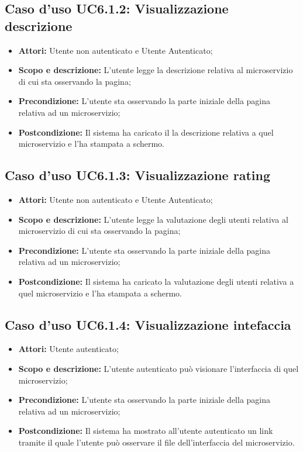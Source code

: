 \documentclass[12pt,a4paper,titlepage]{article}
\begin{document}
 \subsection{Caso d'uso UC6.1.2: Visualizzazione descrizione}
 \begin{itemize}
 	\item \textbf{Attori: }Utente non autenticato e Utente Autenticato;
 	\item \textbf{Scopo e descrizione: }L'utente legge la descrizione relativa al microservizio di cui sta osservando la pagina;
 	\item \textbf{Precondizione: }L'utente sta osservando la parte iniziale della pagina relativa ad un microservizio;
 	\item \textbf{Postcondizione: }Il sistema ha caricato il la descrizione relativa a quel microservizio e l'ha stampata a schermo.
 \end{itemize}
\subsection{Caso d'uso UC6.1.3: Visualizzazione rating}
\begin{itemize}
	\item \textbf{Attori: }Utente non autenticato e Utente Autenticato;
	\item \textbf{Scopo e descrizione: }L'utente legge la valutazione degli utenti relativa al microservizio di cui sta osservando la pagina;
	\item \textbf{Precondizione: }L'utente sta osservando la parte iniziale della pagina relativa ad un microservizio;
	\item \textbf{Postcondizione: }Il sistema ha caricato la valutazione degli utenti relativa a quel microservizio e l'ha stampata a schermo.
\end{itemize}
\subsection{Caso d'uso UC6.1.4: Visualizzazione intefaccia}
\begin{itemize}
	\item \textbf{Attori: }Utente autenticato;
	\item \textbf{Scopo e descrizione: }L'utente autenticato può visionare l'interfaccia di quel microservizio;
	\item \textbf{Precondizione: }L'utente sta osservando la parte iniziale della pagina relativa ad un microservizio;
	\item \textbf{Postcondizione: }Il sistema ha mostrato all'utente autenticato un link tramite il quale l'utente può osservare il file dell'interfaccia del microservizio.
\end{itemize}
\end{document}
